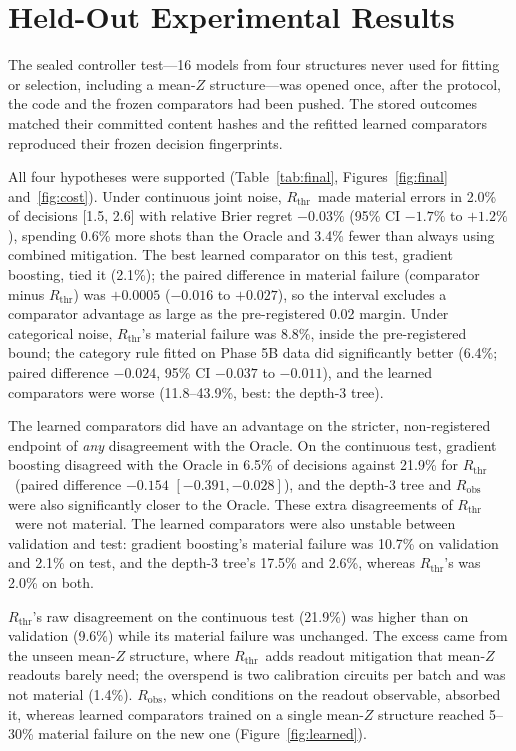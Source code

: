 \documentclass[11pt]{article}
\newcommand{\Rthr}{$R_{\mathrm{thr}}$}
\begin{document}
\section{Held-Out Experimental Results}
\label{sec:results}

The sealed controller test---16 models from four structures never used for fitting or selection, including a mean-$Z$ structure---was opened once, after the protocol, the code and the frozen comparators had been pushed.
The stored outcomes matched their committed content hashes and the refitted learned comparators reproduced their frozen decision fingerprints.

All four hypotheses were supported (Table~\ref{tab:final}, Figures~\ref{fig:final} and~\ref{fig:cost}).
Under continuous joint noise, \Rthr\ made material errors in 2.0\% of decisions [1.5, 2.6] with relative Brier regret $-0.03\%$ (95\% CI $-1.7\%$ to $+1.2\%$), spending 0.6\% more shots than the Oracle and 3.4\% fewer than always using combined mitigation.
The best learned comparator on this test, gradient boosting, tied it (2.1\%); the paired difference in material failure (comparator minus \Rthr) was $+0.0005$ ($-0.016$ to $+0.027$), so the interval excludes a comparator advantage as large as the pre-registered 0.02 margin.
Under categorical noise, \Rthr's material failure was 8.8\%, inside the pre-registered bound; the category rule fitted on Phase 5B data did significantly better (6.4\%; paired difference $-0.024$, 95\% CI $-0.037$ to $-0.011$), and the learned comparators were worse (11.8--43.9\%, best: the depth-3 tree).

The learned comparators did have an advantage on the stricter, non-registered endpoint of \emph{any} disagreement with the Oracle.
On the continuous test, gradient boosting disagreed with the Oracle in 6.5\% of decisions against 21.9\% for \Rthr\ (paired difference $-0.154$ $[-0.391, -0.028]$), and the depth-3 tree and $R_{\mathrm{obs}}$ were also significantly closer to the Oracle.
These extra disagreements of \Rthr\ were not material.
The learned comparators were also unstable between validation and test: gradient boosting's material failure was 10.7\% on validation and 2.1\% on test, and the depth-3 tree's 17.5\% and 2.6\%, whereas \Rthr's was 2.0\% on both.

\Rthr's raw disagreement on the continuous test (21.9\%) was higher than on validation (9.6\%) while its material failure was unchanged.
The excess came from the unseen mean-$Z$ structure, where \Rthr\ adds readout mitigation that mean-$Z$ readouts barely need; the overspend is two calibration circuits per batch and was not material (1.4\%).
$R_{\mathrm{obs}}$, which conditions on the readout observable, absorbed it, whereas learned comparators trained on a single mean-$Z$ structure reached 5--30\% material failure on the new one (Figure~\ref{fig:learned}).
\end{document}
